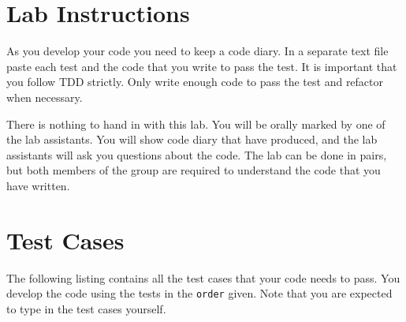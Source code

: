 \documentclass[10pt]{paper}
\begin{document}
\section*{Lab Instructions}
As you develop your code you need to keep a code diary. In a separate text
file paste each test and the code that you write to pass the test. It
is important that you follow TDD strictly. Only write enough code to
pass the test and refactor when necessary. 

There is nothing to hand in with this lab. You will be orally marked
by one of the lab assistants. You will show code diary  that have produced,
and the lab assistants will ask you questions about the code. The lab
can be done in pairs, but both members of the group are required to
understand the code that you have written.  


\section*{Test Cases}
The following listing contains all the test cases that your code needs
to pass. You develop the code using the tests in the {\tt order}
given.   Note that you are expected to type in the test cases
yourself.
\end{document}
